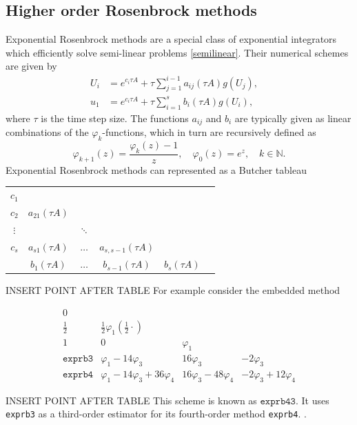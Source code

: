 \documentclass{scrartcl}
\begin{document}
\subsection{Higher order Rosenbrock methods}
Exponential Rosenbrock methods are a special class of exponential integrators which efficiently solve semi-linear problems \ref{semilinear}. Their numerical schemes are given by
\begin{align*}
U_{i} &= e^{c_i \tau A} + \tau\sum_{j=1}^{i-1}a_{ij}(\tau A)g(U_{j}), \quad \\
u_{1} &= e^{c_i \tau A} + \tau\sum_{i=1}^{s}b_i(\tau A)g(U_{i}),
\end{align*}
where $\tau$ is the time step size. The functions $a_{ij}$ and $b_{i}$ are typically given as linear combinations of the $\varphi_k$-functions, which in turn are recursively defined as 
\[\varphi_{k+1}(z) = \frac{\varphi_k(z)-1}z, \quad \varphi_0(z) = e^z, \quad k\in\mathbb{N}.\]
Exponential Rosenbrock methods can represented as a Butcher tableau
\begin{table}[H]
	\centering
	\begin{tabular}{c|ccccc}
		$c_1$ &  &  &  & \\
		$c_2$ & $a_{21}(\tau A)$ &  &  & \\
		$\vdots$ & &  $\ddots$  &  & \\
		$c_s$ & $a_{s1}(\tau A)$ & $\ldots$ & $a_{s,s-1}(\tau A)$  & \\
		\hline
		&$b_1(\tau A)$ & $\ldots$ & $b_{s-1}(\tau A)$ & $b_s(\tau A)$
	\end{tabular}
\end{table}INSERT POINT AFTER TABLE
\noindent For example consider the embedded method
\begin{table}[H]
	\centering
	\[
	\renewcommand\arraystretch{1.2}
	\begin{array}
	{c|ccc}
	0\\
	\frac{1}{2} & \frac{1}{2}\varphi_1(\frac{1}{2}\cdot)\\
	1& 0& \varphi_1\\
	\hline
	\texttt{exprb3} & \varphi_1 - 14\varphi_3 & 16\varphi_3 & -2\varphi_3  \\
	\texttt{exprb4} & \varphi_1 - 14\varphi_3 + 36\varphi_4 & 16\varphi_3 -48\varphi_4 & -2\varphi_3 + 12\varphi_4  
	\end{array}
	\]
\end{table} INSERT POINT AFTER TABLE
\noindent This scheme is known as $\texttt{exprb43}$. It uses \texttt{exprb3} as a third-order estimator for its fourth-order method \texttt{exprb4}. \cite[Example 2.24]{expintbible}.
\end{document}
